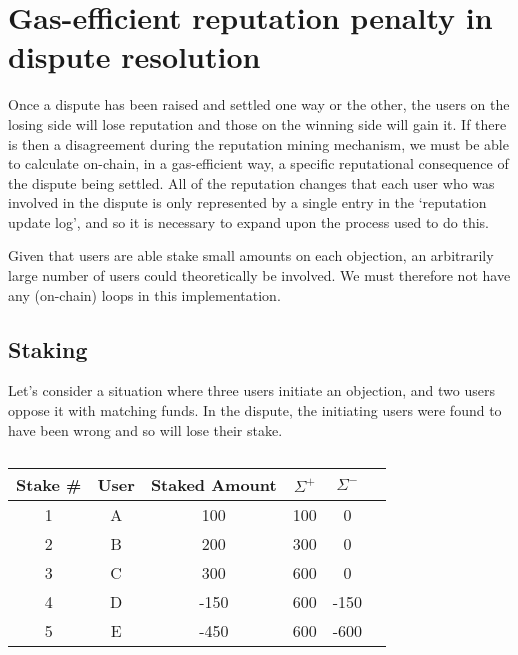 \section{Gas-efficient reputation penalty in dispute resolution}\label{appendix:rep-transfer}

Once a dispute has been raised and settled one way or the other, the users on the losing side will lose reputation and those on the winning side will gain it. If there is then a disagreement during the reputation mining mechanism, we must be able to calculate on-chain, in a gas-efficient way, a specific reputational consequence of the dispute being settled. All of the reputation changes that each user who was involved in the dispute is only represented by a single entry in the `reputation update log', and so it is necessary to expand upon the process used to do this.

Given that users are able stake small amounts on each objection, an arbitrarily large number of users could theoretically be involved. We must therefore not have any (on-chain) loops in this implementation.

\subsection{Staking}

Let's consider a situation where three users initiate an objection, and two users oppose it with matching funds. In the dispute, the initiating users were found to have been wrong and so will lose their stake.

\begin{table}[h]
\centering
\caption{}
\begin{tabular}{|c|c|c|c|c|c|}
\hline
Stake \# & User  & Staked Amount & $\Sigma^+$ & $\Sigma^-$ \\ \hline
1 & A & 100           & 100                      & 0                                                                       \\ \hline
2 & B & 200           & 300                      & 0                                                                       \\ \hline
3 & C & 300           & 600                      & 0                                                                       \\ \hline
4 & D & -150          & 600                      & -150                                                                    \\ \hline
5 & E & -450          & 600                      & -600                                                                    \\ \hline
\end{tabular}
\end{table}

